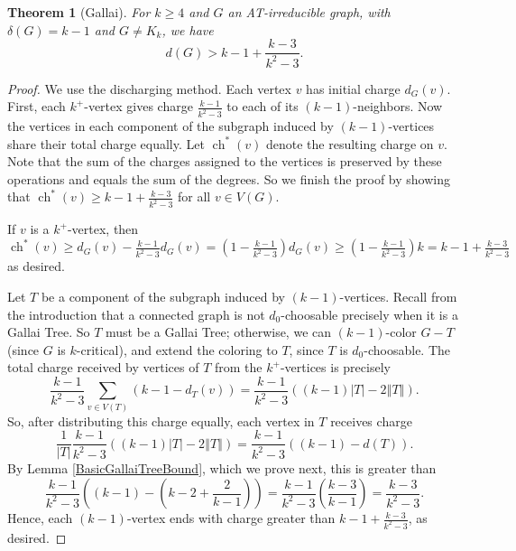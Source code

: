 \documentclass[12pt]{article}
\theoremstyle{plain}
\newtheorem{thm}{Theorem}[section]
\theoremstyle{definition}
\theoremstyle{remark}
\newcommand{\size}[1]{\left\Vert#1\right\Vert}
\newcommand{\parens}[1]{\left( #1 \right)}
\newcommand{\ch}{\operatorname{ch}}
\begin{document}
\begin{thm}[Gallai]
\label{thm:Gallai}
	For $k \ge 4$ and $G$ an AT-irreducible graph, with $\delta(G) = k-1$ and $G \ne K_k$, we have
	\[d(G) > k-1 + \frac{k-3}{k^2-3}.\]
\end{thm}
\begin{proof}
We use the discharging method. Each vertex $v$ has initial charge $d_G(v)$. 
First, each $k^+$-vertex gives charge $\frac{k-1}{k^2-3}$ to each of its
$(k-1)$-neighbors.  Now the vertices in each component of the subgraph induced
by $(k-1)$-vertices share their total charge equally.  
Let $\ch^*(v)$ denote the resulting charge on $v$.  
Note that the sum of the charges assigned to the vertices is preserved by these
operations and equals the sum of the degrees.
So we finish the proof by showing that $\ch^*(v) \ge k-1
+ \frac{k-3}{k^2-3}$ for all $v \in V(G)$.
	
If $v$ is a $k^+$-vertex, then $\ch^*(v) \ge d_G(v) - \frac{k-1}{k^2-3}d_G(v) =
\parens{1- \frac{k-1}{k^2-3}}d_G(v) \ge \parens{1- \frac{k-1}{k^2-3}}k = k-1 +
\frac{k-3}{k^2-3}$ as desired.

Let $T$ be a component of the subgraph induced by $(k-1)$-vertices. 
Recall from the introduction that a connected graph is not $d_0$-choosable
precisely when it is a Gallai Tree.
So $T$ must be a Gallai Tree; otherwise, we can $(k-1)$-color $G-T$ (since $G$
is $k$-critical), and extend the coloring to $T$, since $T$ is $d_0$-choosable.
The total charge received by vertices of $T$ from the $k^+$-vertices is
precisely
\[\frac{k-1}{k^2-3}\sum_{v \in V(T)} (k-1 - d_T(v)) =
\frac{k-1}{k^2-3}\parens{(k-1)|T| - 2\size{T}}.\]
So, after distributing this charge equally, each vertex in $T$ receives charge
\[\frac{1}{|T|}\frac{k-1}{k^2-3}((k-1)|T| - 2\size{T}) = \frac{k-1}{k^2-3}\parens{(k-1) - d(T)}.\]
By Lemma \ref{BasicGallaiTreeBound}, which we prove next, this is greater than
\[\frac{k-1}{k^2-3}\parens{(k-1) - \parens{k-2 + \frac{2}{k-1}}} = \frac{k-1}{k^2-3}\parens{\frac{k-3}{k-1}} = \frac{k-3}{k^2-3}.\]
Hence, each $(k-1)$-vertex ends with charge greater than $k-1 +
\frac{k-3}{k^2-3}$, as desired.
\end{proof}
\end{document}
